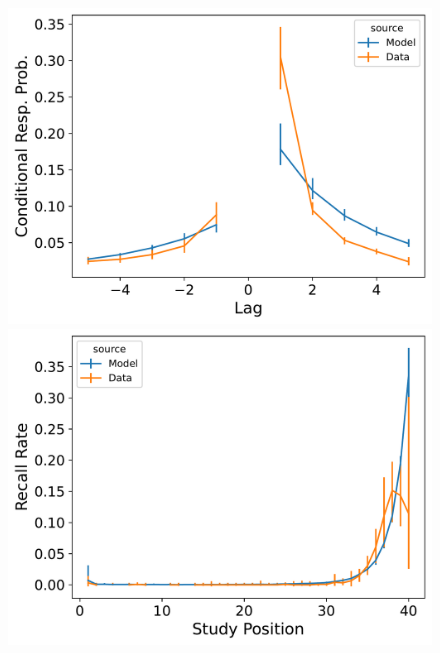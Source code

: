\documentclass[
  letterpaper,
  11pt,
  english,
  singlespacing,
  headsepline]{MastersDoctoralThesis}
\begin{document}
\begin{figure}

\begin{minipage}{0.33\linewidth}
\includegraphics{icmr_figures/Murdock1962_ConnectionistCMR_Model_Fitting_LL40_crp-1.png}\end{minipage}%
%
\begin{minipage}{0.33\linewidth}
\includegraphics{icmr_figures/Murdock1962_ConnectionistCMR_Model_Fitting_LL40_pnr-1.png}\end{minipage}%
%
\begin{minipage}{0.33\linewidth}

\end{minipage}
\end{figure}
\end{document}
